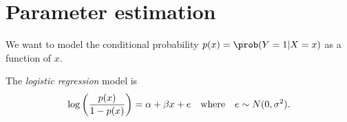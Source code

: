%

\section{Parameter estimation}
%

We want to model the conditional probability $p(x) = \prob(Y=1|X=x)$ as a function of $x$.

%


\vspace*{2ex}
The \emph{logistic regression} model is
%
\[
\log\left(\frac{p(x)}{1-p(x)}\right) = \alpha + \beta x + e \text{\quad where\quad} e\sim N(0,\sigma^2).
\]
%


